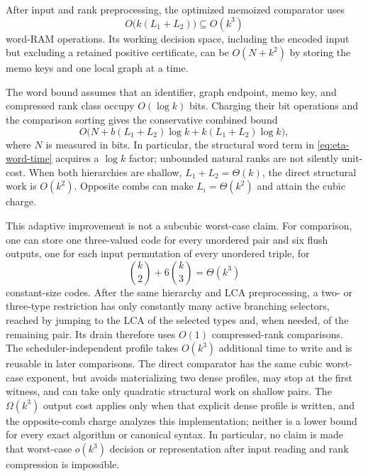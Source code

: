 \begin{theorem}
\label{thm:eta-complexity}
After input and rank preprocessing, the optimized memoized comparator uses
\begin{equation}
 O\bigl(k(L_1+L_2)\bigr)\subseteq O(k^3)
 \label{eq:eta-word-time}
\end{equation}
word-RAM operations.  Its working decision space, including the encoded
input but excluding a retained positive certificate, can be \(O(N+k^2)\) by
storing the memo keys and one local graph at a time.
\end{theorem}

The word bound assumes that an identifier, graph endpoint, memo key, and
compressed rank class occupy \(O(\log k)\) bits.  Charging their bit
operations and the comparison sorting gives the conservative combined bound
\begin{equation}
 O\bigl(
   N+b(L_1+L_2)\log k
    +k(L_1+L_2)\log k
 \bigr),
 \label{eq:eta-bit-time}
\end{equation}
where \(N\) is measured in bits.  In particular, the structural word term in
\autoref{eq:eta-word-time} acquires a \(\log k\) factor; unbounded natural ranks
are not silently unit-cost.  When both hierarchies are shallow,
\(L_1+L_2=\Theta(k)\), the direct structural work is \(O(k^2)\).  Opposite
combs can make \(L_i=\Theta(k^2)\) and attain the cubic charge.

This adaptive improvement is not a subcubic worst-case claim.  For comparison,
one can store one three-valued code for every unordered pair and six flush
outputs, one for each input permutation of every unordered triple, for
\begin{equation}
 \binom{k}{2}+6\binom{k}{3}=\Theta(k^3)
 \label{eq:eta-dense-profile-size}
\end{equation}
constant-size codes.  After the same hierarchy and LCA preprocessing, a
two- or three-type restriction has only constantly many active branching
selectors, reached by jumping to the LCA of the selected types and, when
needed, of the remaining pair.  Its drain therefore uses \(O(1)\)
compressed-rank comparisons.  The scheduler-independent profile takes
\(O(k^3)\) additional time to write and is reusable in later comparisons.
The direct comparator has the same cubic
worst-case exponent, but avoids materializing two dense profiles, may stop at
the first witness, and can take only quadratic structural work on shallow
pairs.  The \(\Omega(k^3)\) output cost applies only when that explicit dense
profile is written, and the opposite-comb charge analyzes this implementation;
neither is a lower bound for every exact algorithm or canonical syntax.  In
particular, no claim is made that worst-case \(o(k^3)\) decision or
representation after input reading and rank compression is impossible.

